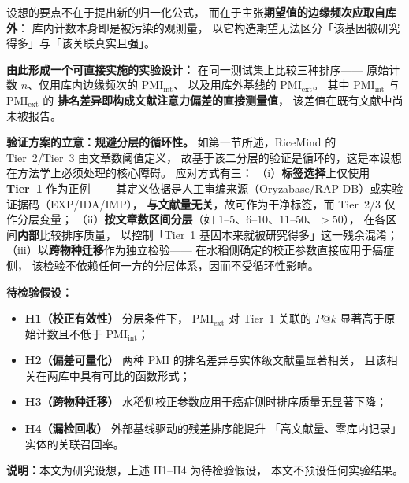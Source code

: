 \documentclass[conference]{IEEEtran}
\begin{document}
设想的要点不在于提出新的归一化公式，
而在于主张\textbf{期望值的边缘频次应取自库外}：
库内计数本身即是被污染的观测量，
以它构造期望无法区分「该基因被研究得多」与「该关联真实且强」。

\textbf{由此形成一个可直接实施的实验设计：}
在同一测试集上比较三种排序——
原始计数 $n$、仅用库内边缘频次的 $\mathrm{PMI}_{\text{int}}$、
以及用库外基线的 $\mathrm{PMI}_{\text{ext}}$。
其中 $\mathrm{PMI}_{\text{int}}$ 与 $\mathrm{PMI}_{\text{ext}}$ 的
\textbf{排名差异即构成文献注意力偏差的直接测量值}，
该差值在既有文献中尚未被报告。

\textbf{验证方案的立意：规避分层的循环性。}
如第一节所述，RiceMind 的 Tier~2/Tier~3 由文章数阈值定义，
故基于该二分层的验证是循环的，这是本设想在方法学上必须处理的核心障碍。
应对方式有三：
（i）\textbf{标签选择}上仅使用 \textbf{Tier~1} 作为正例——
其定义依据是人工审编来源（Oryzabase/RAP-DB）或实验证据码（EXP/IDA/IMP），
\textbf{与文献量无关}，故可作为干净标签，而 Tier~2/3 仅作分层变量；
（ii）\textbf{按文章数区间分层}（如 $1$--$5$、$6$--$10$、$11$--$50$、$>50$），
在各区间\textbf{内部}比较排序质量，
以控制「Tier~1 基因本来就被研究得多」这一残余混淆；
（iii）以\textbf{跨物种迁移}作为独立检验——
在水稻侧确定的校正参数直接应用于癌症侧，
该检验不依赖任何一方的分层体系，因而不受循环性影响。

\textbf{待检验假设：}
\begin{itemize}
  \item \textbf{H1（校正有效性）} 分层条件下，
        $\mathrm{PMI}_{\text{ext}}$ 对 Tier~1 关联的 $P@k$
        显著高于原始计数且不低于 $\mathrm{PMI}_{\text{int}}$；
  \item \textbf{H2（偏差可量化）} 两种 PMI 的排名差异与实体级文献量显著相关，
        且该相关在两库中具有可比的函数形式；
  \item \textbf{H3（跨物种迁移）} 水稻侧校正参数应用于癌症侧时排序质量无显著下降；
  \item \textbf{H4（漏检回收）} 外部基线驱动的残差排序能提升
        「高文献量、零库内记录」实体的关联召回率。
\end{itemize}

\textbf{说明：}本文为研究设想，上述 H1--H4 为待检验假设，
本文不预设任何实验结果。
\end{document}
